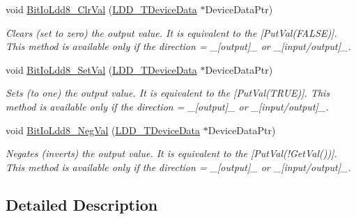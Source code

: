\begin{DoxyCompactItemize}
void \hyperlink{group___bit_io_ldd8__module_ga95bb304469e99fa3999aab32b54a98f5}{Bit\-Io\-Ldd8\-\_\-\-Clr\-Val} (\hyperlink{group___p_e___types__module_gac5cf1362f1f0e3a2ce71b1bf2276d091}{L\-D\-D\-\_\-\-T\-Device\-Data} $\ast$Device\-Data\-Ptr)
\begin{DoxyCompactList}\small\item\em Clears (set to zero) the output value. It is equivalent to the \mbox{[}Put\-Val(\-F\-A\-L\-S\-E)\mbox{]}. This method is available only if the direction = \-\_\-\mbox{[}output\mbox{]}\-\_\- or \-\_\-\mbox{[}input/output\mbox{]}\-\_\-. \end{DoxyCompactList}\item 
void \hyperlink{group___bit_io_ldd8__module_ga813c264d67794a7d48b21051ca6875b5}{Bit\-Io\-Ldd8\-\_\-\-Set\-Val} (\hyperlink{group___p_e___types__module_gac5cf1362f1f0e3a2ce71b1bf2276d091}{L\-D\-D\-\_\-\-T\-Device\-Data} $\ast$Device\-Data\-Ptr)
\begin{DoxyCompactList}\small\item\em Sets (to one) the output value. It is equivalent to the \mbox{[}Put\-Val(\-T\-R\-U\-E)\mbox{]}. This method is available only if the direction = \-\_\-\mbox{[}output\mbox{]}\-\_\- or \-\_\-\mbox{[}input/output\mbox{]}\-\_\-. \end{DoxyCompactList}\item 
void \hyperlink{group___bit_io_ldd8__module_ga9b367282f6e21c61f9869f2958e8c029}{Bit\-Io\-Ldd8\-\_\-\-Neg\-Val} (\hyperlink{group___p_e___types__module_gac5cf1362f1f0e3a2ce71b1bf2276d091}{L\-D\-D\-\_\-\-T\-Device\-Data} $\ast$Device\-Data\-Ptr)
\begin{DoxyCompactList}\small\item\em Negates (inverts) the output value. It is equivalent to the \mbox{[}Put\-Val(!\-Get\-Val())\mbox{]}. This method is available only if the direction = \-\_\-\mbox{[}output\mbox{]}\-\_\- or \-\_\-\mbox{[}input/output\mbox{]}\-\_\-. \end{DoxyCompactList}\end{DoxyCompactItemize}


\subsection{Detailed Description}


